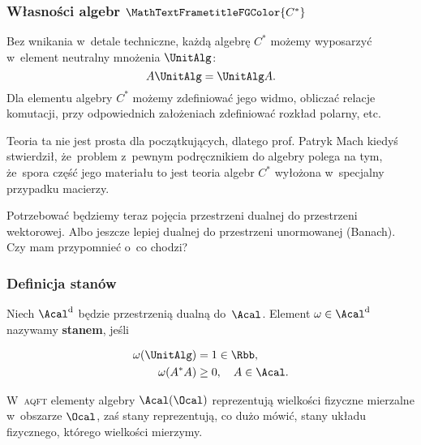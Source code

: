 \documentclass[10pt,t]{beamer}
\begin{document}
\begin{frame}
  \frametitle{Własności algebr
    $\MathTextFrametitleFGColor{C^{ * }}$}


  Bez wnikania w~detale techniczne, każdą algebrę $C^{ * }$ możemy
  wyposarzyć w~element neutralny mnożenia $\UnitAlg$:
  \begin{equation}
    \label{eq:Niespodziewane-teoretyczne-01}
    A \UnitAlg = \UnitAlg A.
  \end{equation}
  Dla elementu algebry $C^{ * }$ możemy zdefiniować jego widmo, obliczać
  relacje komutacji, przy odpowiednich założeniach zdefiniować rozkład
  polarny, etc.

  Teoria ta nie jest prosta dla początkujących, dlatego prof. Patryk Mach
  kiedyś stwierdził, że~problem z~pewnym podręcznikiem do algebry polega na
  tym, że~spora część jego materiału to jest teoria algebr $C^{ * }$
  wyłożona w~specjalny przypadku macierzy.

  Potrzebować będziemy teraz pojęcia przestrzeni dualnej do przestrzeni
  wektorowej. Albo jeszcze lepiej dualnej do przestrzeni unormowanej
  (Banach). Czy mam przypomnieć o~co chodzi?

\end{frame}






\begin{frame}
  \frametitle{Definicja stanów}


  Niech $\Acal^{ \text{d} }$ będzie przestrzenią dualną do~$\Acal$.
  Element $\omega \in \Acal^{ \text{d} }$ nazywamy \textbf{stanem}, jeśli

  \vspace{-2.5em}



  \begin{subequations}

    \begin{align}
      \label{eq:Niespodziewane-teoretyczne-01}
      \omega( \UnitAlg ) &= 1 \in \Rbb, \\
      \omega( A^{ * } A ) &\geq 0, \quad
                            A \in \Acal.
    \end{align}

  \end{subequations}

  \vspace{-2em}



  W~\textsc{aqft} elementy algebry $\Acal( \Ocal )$ reprezentują wielkości
  fizyczne mierzalne w~obszarze $\Ocal$, zaś stany reprezentują, co dużo
  mówić, stany układu fizycznego, którego wielkości mierzymy.

\end{frame}
\end{document}
